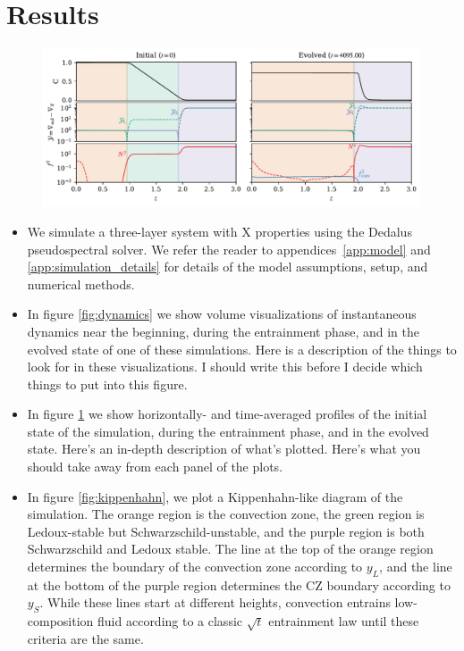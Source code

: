 \section{Results}
\label{sec:result}

\begin{figure}[t]
\centering
\includegraphics[width=\textwidth]{fig2_profiles.pdf}
\caption{
\label{fig:profiles}
}
\end{figure}



\begin{itemize}
\item We simulate a three-layer system with X properties using the Dedalus pseudospectral solver.
We refer the reader to appendices~\ref{app:model} and \ref{app:simulation_details} for details of the model assumptions, setup, and numerical methods.
\item In figure \ref{fig:dynamics} we show volume visualizations of instantaneous dynamics near the beginning, during the entrainment phase, and in the evolved state of one of these simulations.
Here is a description of the things to look for in these visualizations.
I should write this before I decide which things to put into this figure.
\item In figure \ref{fig:profiles} we show horizontally- and time-averaged profiles of the initial state of the simulation, during the entrainment phase, and in the evolved state.
Here's an in-depth description of what's plotted.
Here's what you should take away from each panel of the plots.
\item In figure \ref{fig:kippenhahn}, we plot a Kippenhahn-like diagram of the simulation.
The orange region is the convection zone, the green region is Ledoux-stable but Schwarzschild-unstable, and the purple region is both Schwarzschild and Ledoux stable.
The line at the top of the orange region determines the boundary of the convection zone according to $y_L$, and the line at the bottom of the purple region determines the CZ boundary according to $y_S$.
While these lines start at different heights, convection entrains low-composition fluid according to a classic $\sqrt{t}$ entrainment law until these criteria are the same.
\end{itemize}

